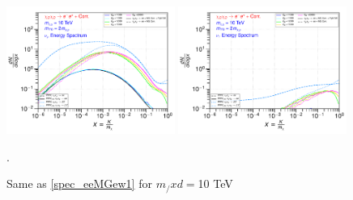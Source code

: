 \documentclass[epj,nopacs,fleqn]{svjour}
\begin{document}
\begin{figure}[!h]
	\subfigure
	{ \includegraphics[width=0.49\textwidth]{Fig/xdxd_ee_eeZ_eveW/10_neutrinos_mu_ee_eeZ_eveW_10.pdf}}
	\subfigure
	{ \includegraphics[width=0.49\textwidth]{Fig/xdxd_ee_eeZ_eveW/10_neutrinos_tau_ee_eeZ_eveW_10.pdf}}
	\caption{Same as \ref{spec_eeMGew1} for  $m_/xd=$10 TeV}.
	\label{spec_eeMGew10}
\end{figure}


\clearpage
\end{document}

